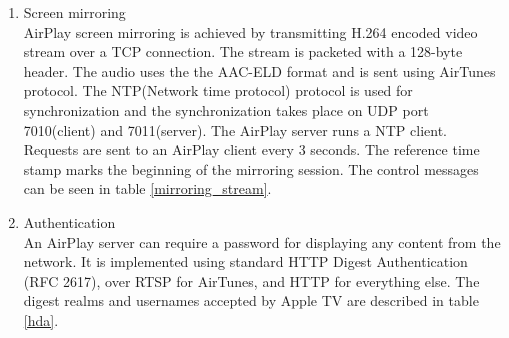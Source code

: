 \begin{enumerate}
\item Screen mirroring \\ 
AirPlay screen mirroring is achieved by transmitting H.264 encoded video stream 
over a TCP connection. The stream is packeted with a 128-byte header. The 
audio uses the the AAC-ELD format and is sent using AirTunes protocol. 
The NTP(Network time protocol) protocol is used for synchronization and the synchronization 
takes place on UDP port 7010(client) and 7011(server). The 
AirPlay server runs a NTP client. Requests are sent to an AirPlay client every 3 
seconds. The reference time stamp marks the beginning of the 
mirroring session.  The control messages can be seen in table 
\ref{mirroring_stream}. 
\begin{table}[htb] 
\caption{AirPlay Mirroring Control HTTP requests \label{mirroring_stream}} 
\begin{center} 
\end{center} 
\end{table} 
\item Authentication \\ 
An AirPlay server can require a password for displaying any content from the 
network. It is implemented using standard HTTP Digest Authentication (RFC 2617), 
over RTSP for AirTunes, and HTTP for everything else. The digest realms and 
usernames accepted by Apple TV are described in table \ref{hda}. 
\begin{table}[htb] 
\caption{AirPlay HTTP Digest Authentication \label{hda}} 
\begin{center} 
\end{center} 
\end{table} 
\end{enumerate} 

